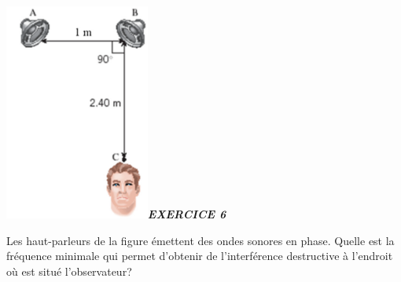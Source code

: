 {\includegraphics[width=4.757cm,height=7.147cm]{Pictures/10000001000001BA00000298E2F6E319C348E061.png}\emph{\textbf{EXERCICE
6}}

Les haut-parleurs de la figure émettent des ondes sonores en phase.
Quelle est la fréquence minimale qui permet d'obtenir de l'interférence
destructive à l'endroit où est situé l'observateur?

}
